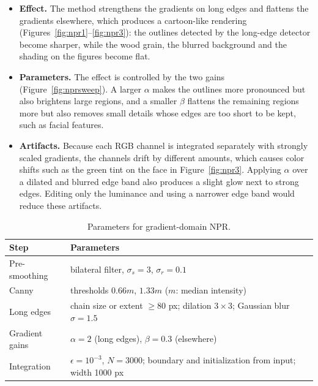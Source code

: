 \documentclass[11pt]{article}
\begin{document}
\begin{itemize}\setlength{\itemsep}{0pt}
\item \textbf{Effect.} The method strengthens the gradients on long edges and flattens the gradients elsewhere, which produces a cartoon-like rendering (Figures~\ref{fig:npr1}--\ref{fig:npr3}): the outlines detected by the long-edge detector become sharper, while the wood grain, the blurred background and the shading on the figures become flat.

\item \textbf{Parameters.} The effect is controlled by the two gains (Figure~\ref{fig:nprsweep}). A larger $\alpha$ makes the outlines more pronounced but also brightens large regions, and a smaller $\beta$ flattens the remaining regions more but also removes small details whose edges are too short to be kept, such as facial features.

\item \textbf{Artifacts.} Because each RGB channel is integrated separately with strongly scaled gradients, the channels drift by different amounts, which causes color shifts such as the green tint on the face in Figure~\ref{fig:npr3}. Applying $\alpha$ over a dilated and blurred edge band also produces a slight glow next to strong edges. Editing only the luminance and using a narrower edge band would reduce these artifacts.
\end{itemize}

\begin{table}[H]
\centering
\small
\begin{tabular}{ll}
\toprule
Step & Parameters \\
\midrule
Pre-smoothing & bilateral filter, $\sigma_s=3$, $\sigma_r=0.1$ \\
Canny & thresholds $0.66m$, $1.33m$ ($m$: median intensity) \\
Long edges & chain size or extent $\geq80$ px; dilation $3\times3$; Gaussian blur $\sigma=1.5$ \\
Gradient gains & $\alpha=2$ (long edges), $\beta=0.3$ (elsewhere) \\
Integration & $\epsilon=10^{-3}$, $N=3000$; boundary and initialization from input; width 1000 px \\
\bottomrule
\end{tabular}
\caption{Parameters for gradient-domain NPR.}
\label{tab:nprparams}
\end{table}

\clearpage
\end{document}
